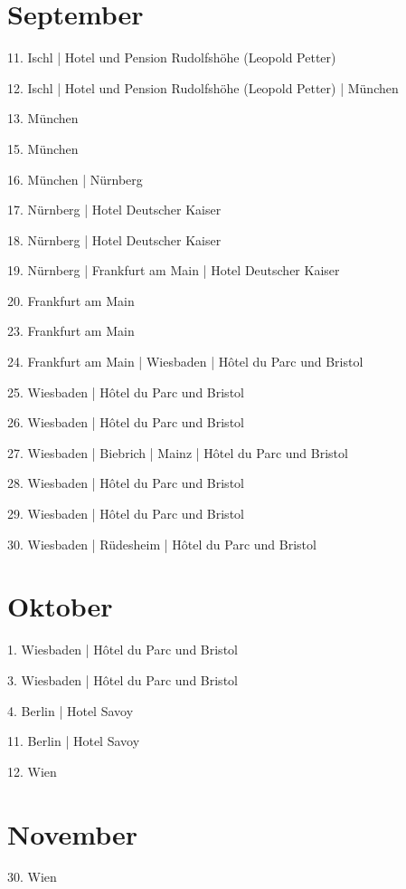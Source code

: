 \documentclass[twoside=false,titlepage=false,open=any, parskip=never, fontsize=10pt, headings=small, chapterprefix=false, appendixprefix=false, DIV=15]{scrbook}
\begin{document}
\begin{multicols}{3}
            \section*{September}
            11. Ischl | Hotel und Pension Rudolfshöhe (Leopold Petter)\par
            12. Ischl | Hotel und Pension Rudolfshöhe (Leopold Petter) | München\par
            13. München\par
            15. München\par
            16. München | Nürnberg\par
            17. Nürnberg | Hotel Deutscher Kaiser\par
            18. Nürnberg | Hotel Deutscher Kaiser\par
            19. Nürnberg | Frankfurt am Main | Hotel Deutscher Kaiser\par
            20. Frankfurt am Main\par
            23. Frankfurt am Main\par
            24. Frankfurt am Main | Wiesbaden | Hôtel du Parc und Bristol\par
            25. Wiesbaden | Hôtel du Parc und Bristol\par
            26. Wiesbaden | Hôtel du Parc und Bristol\par
            27. Wiesbaden | Biebrich | Mainz | Hôtel du Parc und Bristol\par
            28. Wiesbaden | Hôtel du Parc und Bristol\par
            29. Wiesbaden | Hôtel du Parc und Bristol\par
            30. Wiesbaden | Rüdesheim | Hôtel du Parc und Bristol\par
            \section*{Oktober}
            1. Wiesbaden | Hôtel du Parc und Bristol\par
            3. Wiesbaden | Hôtel du Parc und Bristol\par
            4. Berlin | Hotel Savoy\par
            11. Berlin | Hotel Savoy\par
            12. Wien\par
            \section*{November}
            30. Wien\par

\end{multicols}
\end{document}
